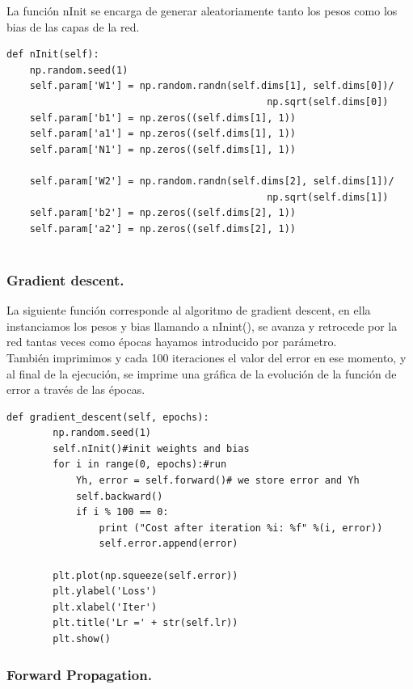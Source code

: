 \documentclass[a4paper,10pt]{article}
\begin{document}
La función nInit se encarga de generar aleatoriamente tanto los pesos como los bias de las capas de la red.
\begin{lstlisting}
def nInit(self): 
    np.random.seed(1)
    self.param['W1'] = np.random.randn(self.dims[1], self.dims[0])/ 
                                             np.sqrt(self.dims[0]) 
    self.param['b1'] = np.zeros((self.dims[1], 1))   
    self.param['a1'] = np.zeros((self.dims[1], 1))        
    self.param['N1'] = np.zeros((self.dims[1], 1))             
     
    self.param['W2'] = np.random.randn(self.dims[2], self.dims[1])/ 
                                             np.sqrt(self.dims[1]) 
    self.param['b2'] = np.zeros((self.dims[2], 1))     
    self.param['a2'] = np.zeros((self.dims[2], 1))   
      
\end{lstlisting}
\subsubsection{Gradient descent.}

La siguiente función corresponde al algoritmo de gradient descent, en ella instanciamos los pesos y bias llamando a nInint(), se avanza y retrocede por la red tantas veces como épocas hayamos introducido por parámetro. \\También imprimimos y cada 100 iteraciones el valor del error en ese momento, y al final de la ejecución, se imprime una gráfica de la evolución de la función de error a través de las épocas.
\begin{lstlisting}
def gradient_descent(self, epochs):
        np.random.seed(1)                         
        self.nInit()#init weights and bias
        for i in range(0, epochs):#run
            Yh, error = self.forward()# we store error and Yh
            self.backward()
            if i % 100 == 0:
                print ("Cost after iteration %i: %f" %(i, error)) 
                self.error.append(error) 

        plt.plot(np.squeeze(self.error))
        plt.ylabel('Loss')
        plt.xlabel('Iter')
        plt.title('Lr =' + str(self.lr))
        plt.show()        

\end{lstlisting}

\subsubsection{Forward Propagation.}
\end{document}
